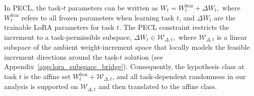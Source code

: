 \documentclass{article}
\theoremstyle{plain}
\theoremstyle{definition}
\theoremstyle{remark}
\begin{document}
In PECL, the task-$t$ parameters can be written as
$
W_t = W^{\mathrm{froz}}_t + \Delta W_t,
$
where $W^{\mathrm{froz}}_t$ refers to
all frozen parameters when learning task $t$, and $\Delta W_t$ are the trainable LoRA parameters for task $t$. 
The PECL constraint restricts the increment to a task-permissible subspace,
$
\Delta W_t \in \mathcal W_{\Delta,t},
$
where $\mathcal W_{\Delta,t}$ is a linear subspace of the ambient weight-increment space that locally models the feasible increment directions around the task-$t$ solution (see Appendix~\ref{app:lora_subspace_bridge}). Consequently, the hypothesis class at task $t$ is the affine set $W^{\mathrm{froz}}_t + \mathcal W_{\Delta,t}$, and all task-dependent randomness in our analysis is supported on $\mathcal W_{\Delta,t}$ and then translated to the affine class.



\end{document}
